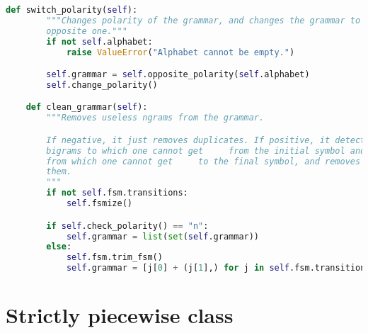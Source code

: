 \begin{lstlisting}[language=Python]
    def switch_polarity(self):
        """Changes polarity of the grammar, and changes the grammar to the
        opposite one."""
        if not self.alphabet:
            raise ValueError("Alphabet cannot be empty.")

        self.grammar = self.opposite_polarity(self.alphabet)
        self.change_polarity()

    def clean_grammar(self):
        """Removes useless ngrams from the grammar.

        If negative, it just removes duplicates. If positive, it detects
        bigrams to which one cannot get     from the initial symbol and
        from which one cannot get     to the final symbol, and removes
        them.
        """
        if not self.fsm.transitions:
            self.fsmize()

        if self.check_polarity() == "n":
            self.grammar = list(set(self.grammar))
        else:
            self.fsm.trim_fsm()
            self.grammar = [j[0] + (j[1],) for j in self.fsm.transitions]
\end{lstlisting}


\section{Strictly piecewise class}

